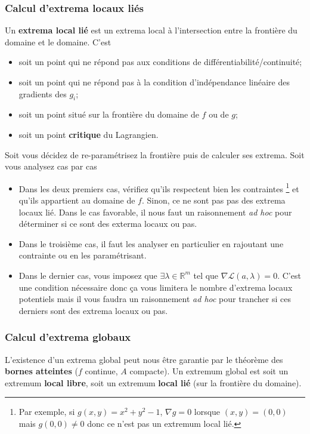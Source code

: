 \documentclass[11pt,a4paper]{article}
\theoremstyle{definition}
\newcommand{\R}{\mathbb{R}}
\begin{document}
\subsubsection{Calcul d'extrema locaux liés}
Un \textbf{extrema local lié} est un extrema local à l'intersection entre la frontière du domaine et le domaine.
C'est
\begin{itemize}
	\item soit un point qui ne répond pas aux conditions de différentiabilité/continuité;
	\item soit un point qui ne répond pas à la condition d'indépendance linéaire des gradients des $g_i$;
	\item soit un point situé sur la frontière du domaine de $f$ ou de $g$;
	\item soit un point \textbf{critique} du Lagrangien.
\end{itemize}
Soit vous décidez de re-paramétrisez la frontière puis de calculer ses extrema.
Soit vous analysez cas par cas
\begin{itemize}
	\item Dans les deux premiers cas, vérifiez qu'ils respectent bien les contraintes
		\footnote{Par exemple, si $g(x, y) = x^2 + y^2 - 1$, $\nabla g = 0$ lorsque $(x, y) = (0, 0)$ mais $g(0, 0) \neq 0$ donc ce n'est pas un extremum local lié.}
		et qu'ils appartient au domaine de $f$.
		Sinon, ce ne sont pas pas des extrema locaux lié.
		Dans le cas favorable, il nous faut un raisonnement \emph{ad hoc} pour déterminer si ce sont des exterma locaux ou pas.
	\item Dans le troisième cas, il faut les analyser en particulier en rajoutant une contrainte ou en les paramétrisant.
	\item Dans le dernier cas, vous imposez que $\exists \lambda \in \R^m$ tel que $\nabla \mathcal{L}(a, \lambda) = 0$.
		C'est une condition nécessaire donc ça vous limitera le nombre d'extrema locaux potentiels mais il vous faudra un raisonnement \emph{ad hoc} pour trancher si ces derniers sont des extrema locaux ou pas.
\end{itemize}

\subsubsection{Calcul d'extrema globaux}
L'existence d'un extrema global peut nous être garantie par le théorème des \textbf{bornes atteintes} ($f$ continue, $A$ compacte).
Un extremum global est soit un extremum \textbf{local libre}, soit un extremum \textbf{local lié} (sur la frontière du domaine).
\end{document}
